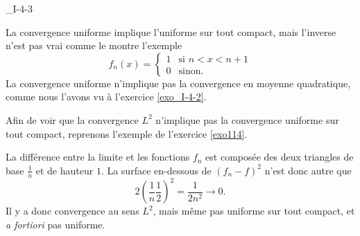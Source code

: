 

\begin{corrige}{_I-4-3}

La convergence uniforme implique l'uniforme sur tout compact, mais l'inverse n'est pas vrai comme le montre l'exemple
\begin{equation}
	f_n(x)=\begin{cases}
	1	&	\text{si $n<x<n+1$}\\
	0	&	 \text{sinon.}
\end{cases}
\end{equation}
La convergence uniforme n'implique pas la convergence en moyenne quadratique, comme nous l'avons vu à l'exercice \ref{exo_I-4-2}.

Afin de voir que la convergence $L^2$ n'implique pas la convergence uniforme sur tout compact, reprenons l'exemple de l'exercice \ref{exo114}.



La différence entre la limite et les fonctions $f_n$ est composée des deux triangles de base $\frac{1}{ n }$ et de hauteur $1$. La surface en-dessous de $(f_n-f)^2$ n'est donc autre que
\begin{equation}
	2\left( \frac{1}{ n }\frac{1}{ 2 } \right)^2=\frac{1}{ 2n^2 }\to 0.
\end{equation}
Il y a donc convergence au sens $L^2$, mais même pas uniforme sur tout compact, et \emph{a fortiori} pas uniforme.

\end{corrige}
